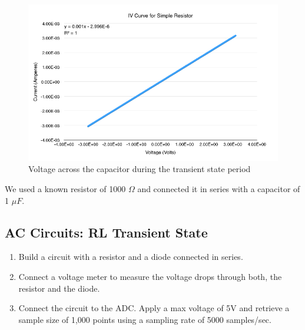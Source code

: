 \documentclass{article}
\begin{document}
\begin{figure}[H]
    \centering
    \includegraphics[width=\textwidth]{charts/rccurve_transient}
    \caption{Voltage across the capacitor during the transient state period}
    \label{rccurve_transient}
\end{figure}

We used a known resistor of 1000 $\Omega$ and connected it in series with
a capacitor of 1 $\mu F$.

\subsection{AC Circuits: RL Transient State}

\begin{enumerate}
    \item Build a circuit with a resistor and a diode connected in series.
    \item Connect a voltage meter to measure the voltage drops through both, the
    resistor and the diode.
    \item Connect the circuit to the ADC. Apply a max voltage of 5V and retrieve
    a sample size of 1,000 points using a sampling rate of 5000 samples/sec.
\end{enumerate}
\end{document}
